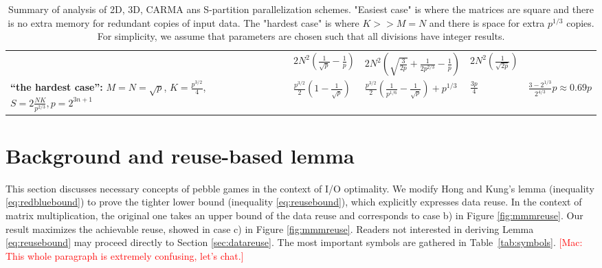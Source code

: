 \documentclass[sigplan,review,anonymous]{acmart}\settopmatter{printfolios=true,printccs=false,printacmref=false}
\newcommand\mac[1]{\textcolor{red}{[Mac: #1]}}
\begin{document}
\begin{table}
\begin{tabular}{lllll}
&
$2N^2 \left(\frac{1}{\sqrt{p}} - \frac{1}{p} \right)$
&
$2N^2 \left(\sqrt{\frac{3}{2p}} + \frac{1}{2p^{2/3}} - \frac{1}{p} \right)$
& 
$2N^2 \left(\frac{1}{\sqrt{2p}} \right)$
%
\vspace{1.0em}
%
\\
%
%
\makecell[l]{\textbf{``the hardest case'':}\\
$M = N = \sqrt{p}$,\\
$K = \frac{p^{3/2}}{4}$,\\
$S = 2\frac{NK}{p^{2/3}}, p=2^{3n + 1}$}
&
$\frac{p^{3/2}}{2}\left(1 - \frac{1}{\sqrt{p}}\right)$
&
$\frac{p^{3/2}}{2}\left(\frac{1}{p^{1/6}} - \frac{1}{\sqrt{p}}\right) + p^{1/3}$
&
$\frac{3p}{4}$
& 
$\frac{3-2^{1/3}}{2^{4/3}}p \approx 0.69 p$
%
\\
%
\bottomrule
%
\end{tabular}
%
\caption{Summary of analysis of 2D, 3D, CARMA ans S-partition parallelization 
schemes. "Easiest case" is where the matrices are square and there is no extra 
memory for redundant copies of input data. The "hardest case" is where $K >> M 
= N$ and there is space for extra $p^{1/3}$ copies. For simplicity, we assume 
that parameters are chosen such that all divisions have integer results.}
%
\label{tab:summary}
\end{table}


\section{Background and reuse-based lemma}
\label{sec:background}

This section discusses necessary concepts of pebble games in the context of I/O 
optimality. We modify Hong and Kung's lemma (inequality 
\ref{eq:redbluebound}) to prove the tighter lower bound (inequality 
\ref{eq:reusebound}), which explicitly expresses data reuse. In the context 
of matrix multiplication, the original one takes an upper bound of the data 
reuse and corresponds to case b) in Figure \ref{fig:mmmreuse}. Our result 
maximizes the achievable reuse, showed in case c) in Figure \ref{fig:mmmreuse}.
Readers not interested in deriving Lemma \ref{eq:reusebound} may proceed 
directly to Section \ref{sec:datareuse}.
The most important
symbols are gathered in Table~\ref{tab:symbols}.
%
\mac{This whole paragraph is extremely confusing, let's chat.}
\end{document}
